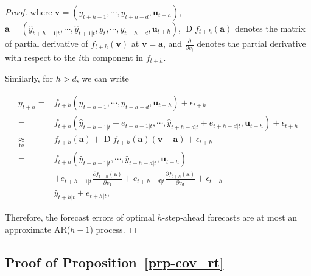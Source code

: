 \documentclass[
  11pt,
  a4paper,
]{article}
\theoremstyle{plain}
\theoremstyle{plain}
\theoremstyle{remark}
\begin{document}
\begin{proof}
where \(\bm{v}=\left(y_{t+h-1},\cdots,y_{t+h-d},\bm{u}_{t+h}\right)\),
\(\bm{a} =\left(\hat{y}_{t+h-1|t},\cdots,\hat{y}_{t+1|t},y_{t},\cdots,y_{t+h-d},\bm{u}_{t+h}\right)\),
\(\operatorname{D}f_{t+h}\left(\bm{a}\right)\) denotes the matrix of
partial derivative of \(f_{t+h}(\bm{v})\) at \(\bm{v}=\bm{a}\), and
\(\frac{\partial}{\partial v_i}\) denotes the partial derivative with
respect to the \(i\)th component in \(f_{t+h}\).

Similarly, for \(h > d\), we can write

\[
\begin{aligned}
y_{t+h}
=&f_{t+h}\left(y_{t+h-1},\cdots,y_{t+h-d},\bm{u}_{t+h}\right)+\epsilon_{t+h} \\
=&f_{t+h}\left(\hat{y}_{t+h-1|t}+e_{t+h-1|t},\cdots,\hat{y}_{t+h-d|t}+e_{t+h-d|t},\bm{u}_{t+h}\right)+\epsilon_{t+h} \\
\underset{\text{te}}{\approx}&f_{t+h}\left(\bm{a}\right)+\operatorname{D}f_{t+h}\left(\bm{a}\right)\left(\bm{v}-\bm{a}\right)+
\epsilon_{t+h} \\
=&f_{t+h}\left(\hat{y}_{t+h-1|t},\cdots,\hat{y}_{t+h-d|t},\bm{u}_{t+h}\right) \\
&+e_{t+h-1|t}\frac{\partial f_{t+h}\left(\bm{a}\right)}{\partial v_1}+e_{t+h-d|t}\frac{\partial f_{t+h}\left(\bm{a}\right)}{\partial v_{d}}+\epsilon_{t+h} \\
=&\hat{y}_{t+h|t}+e_{t+h|t},
\end{aligned}
\]

Therefore, the forecast errors of optimal \(h\)-step-ahead forecasts are
at most an approximate AR(\(h-1\)) process.
\end{proof}

\subsection{\texorpdfstring{Proof of
Proposition~\ref{prp-cov_rt}}{Proof of Proposition~}}\label{sec-proof_cov_rt}
\end{document}
